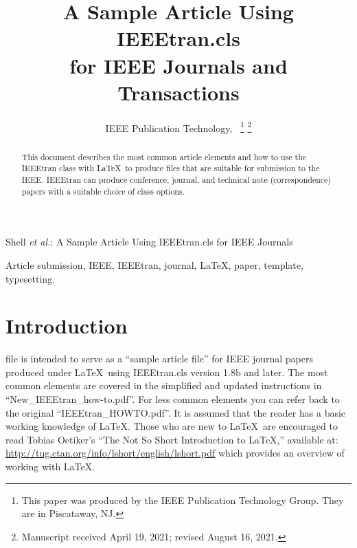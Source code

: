 \documentclass[lettersize,journal]{IEEEtran}
\begin{document}
\title{A Sample Article Using IEEEtran.cls\\ for IEEE Journals and Transactions}

\author{IEEE Publication Technology,~
\thanks{This paper was produced by the IEEE Publication Technology Group. They are in Piscataway, NJ.}%
\thanks{Manuscript received April 19, 2021; revised August 16, 2021.}}

%
{Shell \MakeLowercase{\textit{et al.}}: A Sample Article Using IEEEtran.cls for IEEE Journals}


\maketitle

\begin{abstract}
This document describes the most common article elements and how to use the IEEEtran class with \LaTeX \ to produce files that are suitable for submission to the IEEE.  IEEEtran can produce conference, journal, and technical note (correspondence) papers with a suitable choice of class options. 
\end{abstract}

\begin{IEEEkeywords}
Article submission, IEEE, IEEEtran, journal, \LaTeX, paper, template, typesetting.
\end{IEEEkeywords}

\section{Introduction}
 file is intended to serve as a ``sample article file''
for IEEE journal papers produced under \LaTeX\ using
IEEEtran.cls version 1.8b and later. The most common elements are covered in the simplified and updated instructions in ``New\_IEEEtran\_how-to.pdf''. For less common elements you can refer back to the original ``IEEEtran\_HOWTO.pdf''. It is assumed that the reader has a basic working knowledge of \LaTeX. Those who are new to \LaTeX \ are encouraged to read Tobias Oetiker's ``The Not So Short Introduction to \LaTeX ,'' available at: \url{http://tug.ctan.org/info/lshort/english/lshort.pdf} which provides an overview of working with \LaTeX.
\end{document}
